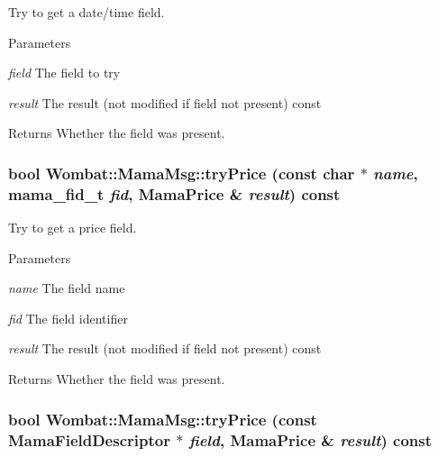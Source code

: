 Try to get a date/time field. 
\begin{DoxyParams}{Parameters}
\item[{\em field}]The field to try \item[{\em result}]The result (not modified if field not present) const \end{DoxyParams}
\begin{DoxyReturn}{Returns}
Whether the field was present. 
\end{DoxyReturn}
\hypertarget{classWombat_1_1MamaMsg_a28618d94be1fb014a65a9afe1a4029cc}{
\subsubsection[{tryPrice}]{\setlength{\rightskip}{0pt plus 5cm}bool Wombat::MamaMsg::tryPrice (const char $\ast$ {\em name}, \/  mama\_\-fid\_\-t {\em fid}, \/  {\bf MamaPrice} \& {\em result}) const}}
\label{classWombat_1_1MamaMsg_a28618d94be1fb014a65a9afe1a4029cc}


Try to get a price field. 
\begin{DoxyParams}{Parameters}
\item[{\em name}]The field name \item[{\em fid}]The field identifier \item[{\em result}]The result (not modified if field not present) const \end{DoxyParams}
\begin{DoxyReturn}{Returns}
Whether the field was present. 
\end{DoxyReturn}
\hypertarget{classWombat_1_1MamaMsg_a4280796414232fc0e831f1e47b8a3806}{
\subsubsection[{tryPrice}]{\setlength{\rightskip}{0pt plus 5cm}bool Wombat::MamaMsg::tryPrice (const {\bf MamaFieldDescriptor} $\ast$ {\em field}, \/  {\bf MamaPrice} \& {\em result}) const}}
\label{classWombat_1_1MamaMsg_a4280796414232fc0e831f1e47b8a3806}


